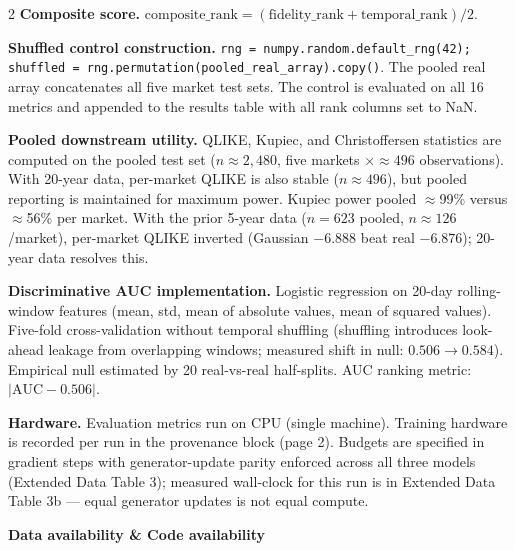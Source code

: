 \documentclass[10pt]{article}
\begin{document}
\begin{multicols}{2}
\textbf{Composite score.}
$\text{composite\_rank} = (\text{fidelity\_rank} + \text{temporal\_rank}) / 2$.

\textbf{Shuffled control construction.}
\texttt{rng = numpy.random.default\_rng(42); shuffled = rng.permutation(pooled\_real\_array).copy()}. The pooled real array concatenates all five market test sets. The control is evaluated on all 16 metrics and appended to the results table with all rank columns set to NaN.

\textbf{Pooled downstream utility.}
QLIKE, Kupiec, and Christoffersen statistics are computed on the pooled test set ($n\approx2{,}480$, five markets $\times\approx496$ observations). With 20-year data, per-market QLIKE is also stable ($n\approx496$), but pooled reporting is maintained for maximum power. Kupiec power pooled $\approx$99\% versus $\approx$56\% per market. With the prior 5-year data ($n=623$ pooled, $n\approx126$/market), per-market QLIKE inverted (Gaussian $-6.888$ beat real $-6.876$); 20-year data resolves this.

\textbf{Discriminative AUC implementation.}
Logistic regression on 20-day rolling-window features (mean, std, mean of absolute values, mean of squared values). Five-fold cross-validation without temporal shuffling (shuffling introduces look-ahead leakage from overlapping windows; measured shift in null: $0.506 \to 0.584$). Empirical null estimated by 20 real-vs-real half-splits. AUC ranking metric: $|\text{AUC} - 0.506|$.

\textbf{Hardware.} Evaluation metrics run on CPU (single machine). Training hardware is recorded per run in the provenance block (page 2). Budgets are specified in gradient steps with generator-update parity enforced across all three models (Extended Data Table 3); measured wall-clock for this run is in Extended Data Table 3b --- equal generator updates is not equal compute.

\end{multicols}

\clearpage

\begin{tcolorbox}[
  colback=NavyBg, colframe=NavyBg!60!black, arc=4pt,
  left=8pt, right=8pt, top=4pt, bottom=4pt,
  before skip=0pt, after skip=10pt]
{\large\bfseries\color{Navy} Data availability \& Code availability}
\end{tcolorbox}
\end{document}
